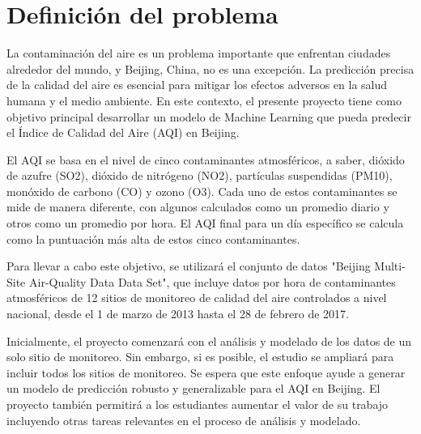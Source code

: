 \section{Definición del problema}

La contaminación del aire es un problema importante que enfrentan ciudades alrededor del mundo, y Beijing, China, no es una excepción. La predicción precisa de la calidad del aire es esencial para mitigar los efectos adversos en la salud humana y el medio ambiente. En este contexto, el presente proyecto tiene como objetivo principal desarrollar un modelo de Machine Learning que pueda predecir el Índice de Calidad del Aire (AQI) en Beijing.

El AQI se basa en el nivel de cinco contaminantes atmosféricos, a saber, dióxido de azufre (SO2), dióxido de nitrógeno (NO2), partículas suspendidas (PM10), monóxido de carbono (CO) y ozono (O3). Cada uno de estos contaminantes se mide de manera diferente, con algunos calculados como un promedio diario y otros como un promedio por hora. El AQI final para un día específico se calcula como la puntuación más alta de estos cinco contaminantes.

Para llevar a cabo este objetivo, se utilizará el conjunto de datos "Beijing Multi-Site Air-Quality Data Data Set", que incluye datos por hora de contaminantes atmosféricos de 12 sitios de monitoreo de calidad del aire controlados a nivel nacional, desde el 1 de marzo de 2013 hasta el 28 de febrero de 2017.

Inicialmente, el proyecto comenzará con el análisis y modelado de los datos de un solo sitio de monitoreo. Sin embargo, si es posible, el estudio se ampliará para incluir todos los sitios de monitoreo. Se espera que este enfoque ayude a generar un modelo de predicción robusto y generalizable para el AQI en Beijing. El proyecto también permitirá a los estudiantes aumentar el valor de su trabajo incluyendo otras tareas relevantes en el proceso de análisis y modelado.
